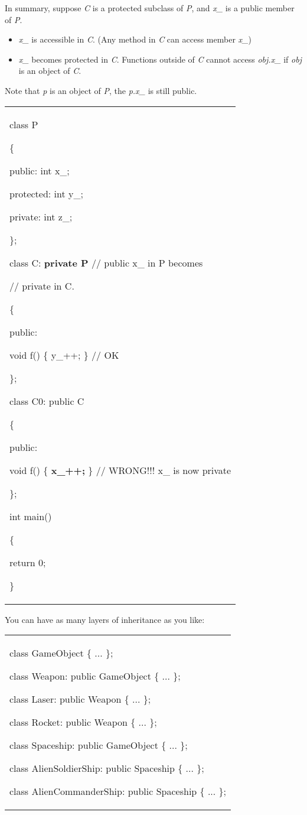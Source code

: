 \documentclass[
]{article}
\providecommand{\tightlist}{%
  \setlength{\itemsep}{0pt}\setlength{\parskip}{0pt}}
\begin{document}
In summary, suppose \emph{C} is a protected subclass of \emph{P}, and
\emph{x\_} is a public member of \emph{P}.

\begin{itemize}
\tightlist
\item
  \emph{x\_} is accessible in \emph{C}. (Any method in \emph{C} can
  access member \emph{x\_})
\item
  \emph{x\_} becomes protected in \emph{C}. Functions outside of
  \emph{C} cannot access \emph{obj.x\_} if \emph{obj} is an object of
  \emph{C}.
\end{itemize}

Note that \emph{p} is an object of \emph{P}, the \emph{p.x\_} is still
public.

\begin{longtable}[]{@{}
  >{\raggedright\arraybackslash}p{}@{}}
\toprule\noalign{}
 \\
\midrule\noalign{}
\endhead
\bottomrule\noalign{}
\endlastfoot
class P

\{

public: int x\_;

protected: int y\_;

private: int z\_;

\};

class C: \textbf{private P }// public x\_ in P becomes

// private in C.

\{

public:

void f() \{ y\_++; \} // OK

\};

class C0: public C

\{

public:

void f() \{ \textbf{x\_++;} \} // WRONG!!! x\_ is now private

\};

int main()

\{

return 0;

\} \\
\end{longtable}

You can have as many layers of inheritance as you like:

\begin{longtable}[]{@{}
  >{\raggedright\arraybackslash}p{}@{}}
\toprule\noalign{}
 \\
\midrule\noalign{}
\endhead
\bottomrule\noalign{}
\endlastfoot
class GameObject \{ ... \};

class Weapon: public GameObject \{ ... \};

class Laser: public Weapon \{ ... \};

class Rocket: public Weapon \{ ... \};

class Spaceship: public GameObject \{ ... \};

class AlienSoldierShip: public Spaceship \{ ... \};

class AlienCommanderShip: public Spaceship \{ ... \}; \\
\end{longtable}
\end{document}

